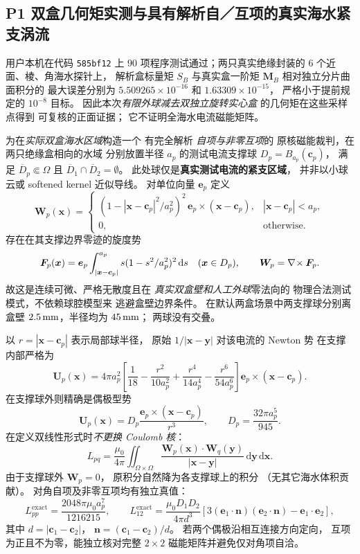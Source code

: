\subsection{P1 双盒几何矩实测与具有解析自／互项的真实海水紧支涡流}
用户本机在代码 \texttt{585bf12} 上
90 项程序测试通过；两只真实绝缘封装的
6 个近面、棱、角海水探针上，
解析盒标量矩 $S_B$ 与真实盒一阶矩
$\bm M_B$ 相对独立分片曲面积分的
最大误差分别为
$5.509265\times10^{-16}$ 和
$1.63309\times10^{-15}$，
严格小于提前规定的 $10^{-8}$ 目标。
因此本次\emph{有限外球减去双独立旋转实心盒}
的几何矩在这些采样点得到
可复核的正面证据；
它不证明全海水电流磁能矩阵。

为在\emph{实际双盒海水区域}构造一个
有完全解析 \emph{自项与非零互项}的
原核磁能裁判，在两只绝缘盒相向的水域
分别放置半径 $a_p$ 的测试电流支撑球
$D_p=B_{a_p}(\bm c_p)$，
满足 $\overline D_p\Subset\Omega$ 且
$\overline D_1\cap\overline D_2=\emptyset$。
此处球仅是\textbf{真实测试电流的紧支区域}，
并非以小球云或 softened kernel 近似导线。
对单位向量 $\bm e_p$ 定义
\[
\bm W_p(\bm x)=
\begin{cases}
(1-|\bm x-\bm c_p|^2/a_p^2)^2\,
\bm e_p\times(\bm x-\bm c_p),
&|\bm x-\bm c_p|<a_p,\\
0,&\text{otherwise}.
\end{cases}
\]
存在在其支撑边界零迹的旋度势
\[
\bm F_p(\bm x)=
\bm e_p\int_{|\bm x-\bm c_p|}^{a_p}
s(1-s^2/a_p^2)^2\,\mathrm ds
\quad(\bm x\in D_p),\qquad
\bm W_p=\nabla\!\times\bm F_p.
\]
故这是连续可微、严格无散度且在
\emph{真实双盒壁和人工外球}零法向的
物理合法测试模式，不依赖球腔模型来
逃避盒壁边界条件。
在默认两盒场景中两支撑球分别离盒壁
$2.5\,{\rm mm}$，半径均为 $45\,{\rm mm}$；
两球没有交叠。

以 $r=|\bm x-\bm c_p|$ 表示局部球半径，
原始 $1/|\bm x-\bm y|$ 对该电流的 Newton 势
在支撑内部严格为
\[
\bm U_p(\bm x)=
4\pi a_p^2\!
\left[\frac1{18}-\frac{r^2}{10a_p^2}
+\frac{r^4}{14a_p^4}
-\frac{r^6}{54a_p^6}\right]
\bm e_p\times(\bm x-\bm c_p).
\]
在支撑球外则精确是偶极型势
\[
\bm U_p(\bm x)=
D_p\frac{\bm e_p\times(\bm x-\bm c_p)}{r^3},
\qquad D_p=\frac{32\pi a_p^5}{945}.
\]
在定义双线性形式时\emph{不更换 Coulomb 核}：
\[
L_{pq}=\frac{\mu_0}{4\pi}
\iint_{\Omega\times\Omega}
\frac{\bm W_p(\bm x)\cdot\bm W_q(\bm y)}
{|\bm x-\bm y|}\,\mathrm d\bm y\,\mathrm d\bm x .
\]
由于支撑球外 $\bm W_p=0$，
原积分自然降为各支撑球上的积分
（无其它海水体积贡献）。
对角自项及非零互项均有独立真值：
\begin{equation}
\boxed{
L_{pp}^{\mathrm{exact}}=
\frac{2048\pi\mu_0 a_p^7}{1216215},\qquad
L_{12}^{\mathrm{exact}}=
\frac{\mu_0D_1D_2}{4\pi d^3}
\left[3(\bm e_1\!\cdot\!\bm n)
(\bm e_2\!\cdot\!\bm n)-\bm e_1\!\cdot\!\bm e_2\right],
}
\label{eq:p1-two-physical-vortices-L}
\end{equation}
其中 $d=|\bm c_1-\bm c_2|$，
$\bm n=(\bm c_1-\bm c_2)/d$。
若两个偶极沿相互连接方向定向，
互项为正且不为零，能独立核对完整
$2\times2$ 磁能矩阵并避免仅对角项自洽。

